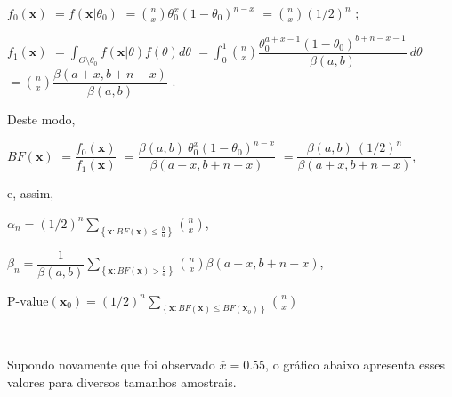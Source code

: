 \documentclass[
]{book}
\begin{document}
\(f_0(\boldsymbol x)\) \(= f(\boldsymbol x | \theta_0)\)
\(=\displaystyle \binom{n}{x} {\theta}_0^x (1-{\theta}_0)^{n-x}\)
\(=\displaystyle \binom{n}{x} {(1/2)^{n}}\) ;

\(f_1(\boldsymbol x)\)
\(=\displaystyle \int_{\Theta\setminus\theta_0} f(\boldsymbol x|\theta) f(\theta) d\theta\)
\(=\displaystyle \int_0^1 \binom{n}{x} \dfrac{{\theta}_0^{a+x-1} (1-{\theta}_0)^{b+n-x-1}}{\beta(a,b)}~d\theta\)
\(=\displaystyle \binom{n}{x}\dfrac{\beta(a+x,b+n-x)}{\beta(a,b)}\) .

Deste modo,

\(BF(\boldsymbol x)\) \(=\dfrac{f_0(\boldsymbol x)}{f_1(\boldsymbol x)}\)
\(=\dfrac{\beta(a,b)~{\theta}_0^x (1-{\theta}_0)^{n-x}}{\beta(a+x,b+n-x)}\)
\(=\dfrac{\beta(a,b)~(1/2)^{n}}{\beta(a+x,b+n-x)}\),

e, assim,

\(\alpha_n = \displaystyle {(1/2)^{n}} \sum_{\left\{\boldsymbol x: BF(\boldsymbol x)\leq\frac{b}{a}\right\}}\binom{n}{x}\),

\(\beta_n = \displaystyle \dfrac{1}{{\beta(a,b)}} \sum_{\left\{\boldsymbol x: BF(\boldsymbol x)>\frac{b}{a}\right\}}\binom{n}{x}\beta(a+x,b+n-x)\),

\(\text{P-value}(\boldsymbol x_0) = \displaystyle {(1/2)^{n}} \sum_{\left\{\boldsymbol x: BF(\boldsymbol x)\leq BF(\boldsymbol x_o)\right\}}\binom{n}{x}\)

\(~\)

Supondo novamente que foi observado \(\bar{x}=0.55\), o gráfico abaixo apresenta esses valores para diversos tamanhos amostrais.
\end{document}
